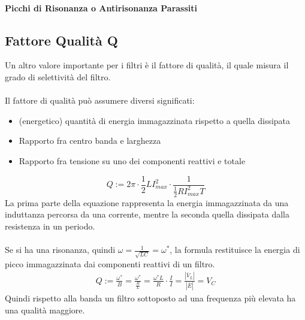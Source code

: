 \documentclass[../main.tex]{subfiles}
\begin{document}
	\paragraph{Picchi di Risonanza o Antirisonanza Parassiti}
	\subsection{Fattore Qualità Q}
	Un altro valore importante per i filtri è il fattore di qualità, il quale misura il grado di selettività del filtro.\\\\
	Il fattore di qualità può assumere diversi significati:
	\begin{itemize}
		\item (energetico) quantità di energia immagazzinata rispetto a quella dissipata
		\item Rapporto fra centro banda e larghezza
		\item Rapporto fra tensione su uno dei componenti reattivi e totale
	\end{itemize}
	\begin{equation}
		Q:=2\pi \cdot \frac{1}{2}LI_{max}^2\cdot \frac{1}{\frac{1}{2}RI_{max}^2 T}	
	\end{equation}
	La prima parte della equazione rappresenta la energia immagazzinata da una induttanza percorsa da una corrente, mentre la seconda quella dissipata dalla resistenza in un periodo.\\\\
	Se si ha una risonanza, quindi $\omega = \frac{1}{\sqrt{LC}}=\omega^\ast$, la formula restituisce la energia di picco immagazzinata dai componenti reattivi di un filtro.
	\begin{gather}
		Q:=\frac{\omega^\ast}{B}=\frac{\omega^\ast}{\frac{R}{L}}	=\frac{\omega^\ast L}{R}\cdot \frac{I}{I}=\frac{|\bar V_L|}{|\bar E|}=V_C
	\end{gather}
	Quindi rispetto alla banda un filtro sottoposto ad una frequenza più elevata ha una qualità maggiore.
\end{document}
